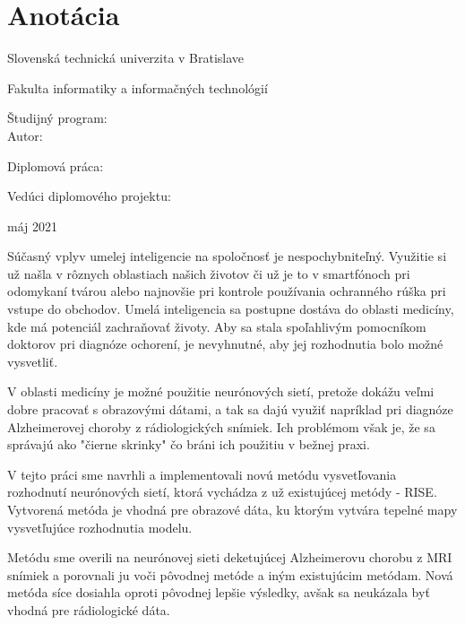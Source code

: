 
\thispagestyle{empty}
\section*{Anotácia}

\begin{minipage}[t]{1\columnwidth}%
Slovenská technická univerzita v Bratislave

Fakulta informatiky a informačných technológií

Študijný program: \myStudyProgram\\

Autor: \myName

Diplomová práca: \myTitle

Vedúci diplomového projektu: \mySupervisor

máj 2021
\end{minipage}

\bigskip{}

Súčasný vplyv umelej inteligencie na spoločnosť je nespochybniteľný. Využitie si už našla v rôznych oblastiach našich životov či už je to v smartfónoch pri odomykaní tvárou alebo najnovšie pri kontrole používania ochranného rúška pri vstupe do obchodov. Umelá inteligencia sa postupne dostáva do oblasti medicíny, kde má potenciál zachraňovať životy. Aby sa stala spoľahlivým pomocníkom doktorov pri diagnóze ochorení, je nevyhnutné, aby jej rozhodnutia bolo možné vysvetliť. 

V oblasti medicíny je možné použitie neurónových sietí, pretože dokážu veľmi dobre pracovať s obrazovými dátami, a tak sa dajú využiť napríklad pri diagnóze Alzheimerovej choroby z rádiologických snímiek. Ich problémom však je, že sa správajú ako "čierne skrinky" čo bráni ich použitiu v bežnej praxi.

V tejto práci sme navrhli a implementovali novú metódu vysvetľovania rozhodnutí neurónových sietí, ktorá vychádza z už existujúcej metódy - RISE. Vytvorená metóda je vhodná pre obrazové dáta, ku ktorým vytvára tepelné mapy vysvetľujúce rozhodnutia modelu.

Metódu sme overili na neurónovej sieti deketujúcej Alzheimerovu chorobu z MRI snímiek a porovnali ju voči pôvodnej metóde a iným existujúcim metódam. Nová metóda síce dosiahla oproti pôvodnej lepšie výsledky, avšak sa neukázala byť vhodná pre rádiologické dáta.

\newpage
\thispagestyle{empty}
\mbox{}
\newpage